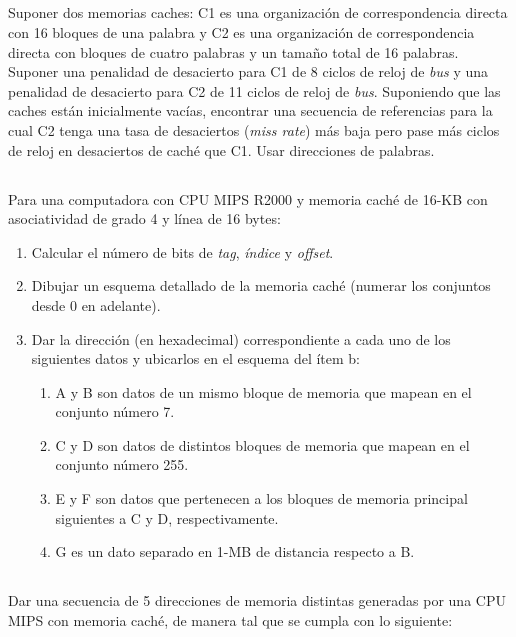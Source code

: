  
\subsection{}
Suponer dos memorias caches: C1 es una organización de correspondencia directa con 16 bloques de una palabra y C2 es una organización de correspondencia directa con bloques de cuatro palabras y un tamaño total de 16 palabras. Suponer una penalidad de desacierto para C1 de 8 ciclos de reloj de \textit{bus} y una penalidad de desacierto para C2 de 11 ciclos de reloj de \textit{bus}. Suponiendo que las caches están inicialmente vacías, encontrar una secuencia de referencias para la cual C2 tenga una tasa de desaciertos (\textit{miss rate}) más baja pero pase más ciclos de reloj en desaciertos de caché que C1. Usar direcciones de palabras.

\subsection{}
Para una computadora con CPU MIPS R2000 y memoria caché de 16-KB con asociatividad de grado 4 y línea de 16 bytes:

\begin{enumerate}
 \item Calcular el número de bits de \textit{tag}, \textit{índice} y \textit{offset}.
 \item Dibujar un esquema detallado de la memoria caché (numerar los conjuntos desde 0 en adelante).
 \item Dar la dirección (en hexadecimal) correspondiente a cada uno de los siguientes datos y ubicarlos en el esquema del ítem b:

\begin{enumerate}
 \item A y B son datos de un mismo bloque de memoria que mapean en el conjunto número 7.
 \item C y D son datos de distintos bloques de memoria que mapean en el conjunto número 255.
 \item E y F son datos que pertenecen a los bloques de memoria principal siguientes a C y D, respectivamente.
 \item G es un dato separado en 1-MB de distancia respecto a B. 
\end{enumerate}
\end{enumerate}

\subsection{}
Dar una secuencia de 5 direcciones de memoria distintas generadas por una CPU MIPS con memoria caché, de manera tal que se cumpla con lo siguiente:

